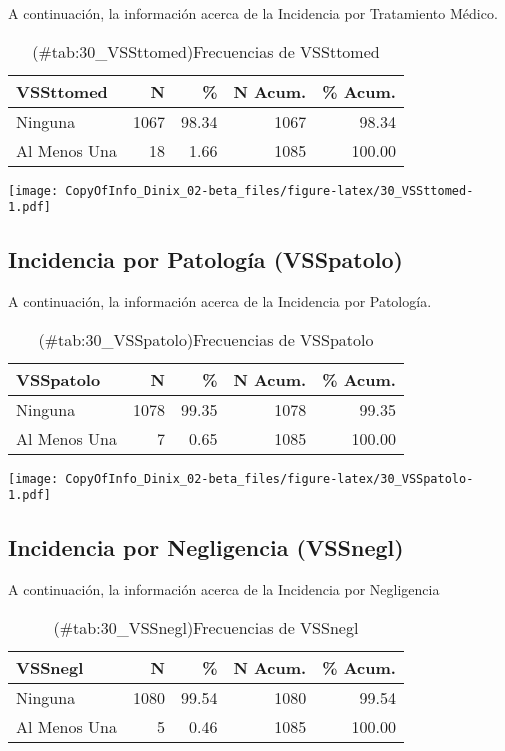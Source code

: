 \documentclass[
]{article}
\begin{document}
A continuación, la información acerca de la Incidencia por Tratamiento Médico.

\begin{table}

\caption{(\#tab:30_VSSttomed)Frecuencias de VSSttomed}
\centering
\begin{tabular}[t]{lrrrr}
\toprule
VSSttomed & N & \% & N Acum. & \% Acum.\\
\midrule
Ninguna & 1067 & 98.34 & 1067 & 98.34\\
Al Menos Una & 18 & 1.66 & 1085 & 100.00\\
\bottomrule
\end{tabular}
\end{table}

\texttt{[image: CopyOfInfo\_Dinix\_02-beta\_files/figure-latex/30\_VSSttomed-1.pdf]}

\subsection{Incidencia por Patología (VSSpatolo)}\label{incidencia-por-patologuxeda-vsspatolo}

A continuación, la información acerca de la Incidencia por Patología.

\begin{table}

\caption{(\#tab:30_VSSpatolo)Frecuencias de VSSpatolo}
\centering
\begin{tabular}[t]{lrrrr}
\toprule
VSSpatolo & N & \% & N Acum. & \% Acum.\\
\midrule
Ninguna & 1078 & 99.35 & 1078 & 99.35\\
Al Menos Una & 7 & 0.65 & 1085 & 100.00\\
\bottomrule
\end{tabular}
\end{table}

\texttt{[image: CopyOfInfo\_Dinix\_02-beta\_files/figure-latex/30\_VSSpatolo-1.pdf]}

\subsection{Incidencia por Negligencia (VSSnegl)}\label{incidencia-por-negligencia-vssnegl}

A continuación, la información acerca de la Incidencia por Negligencia

\begin{table}

\caption{(\#tab:30_VSSnegl)Frecuencias de VSSnegl}
\centering
\begin{tabular}[t]{lrrrr}
\toprule
VSSnegl & N & \% & N Acum. & \% Acum.\\
\midrule
Ninguna & 1080 & 99.54 & 1080 & 99.54\\
Al Menos Una & 5 & 0.46 & 1085 & 100.00\\
\bottomrule
\end{tabular}
\end{table}
\end{document}
